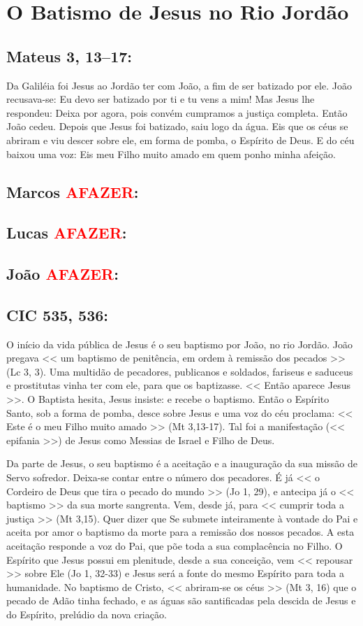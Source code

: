 \documentclass[10pt,a5paper]{book}
\newcommand{\from}[1]{\subsection*{#1}}
\newcommand{\TODO}{\textcolor{red}{\ttfamily AFAZER}}
\begin{document}

\section{O Batismo de Jesus no Rio Jordão}

\from{Mateus 3, 13--17:}

Da Galiléia foi Jesus ao Jordão ter com João, a fim de ser batizado por ele.
João recusava-se: Eu devo ser batizado por ti e tu vens a mim!
Mas Jesus lhe respondeu: Deixa por agora, pois convém cumpramos a justiça completa. Então João cedeu.
Depois que Jesus foi batizado, saiu logo da água. Eis que os céus se abriram e viu descer sobre ele, em forma de pomba, o Espírito de Deus.
E do céu baixou uma voz: Eis meu Filho muito amado em quem ponho minha afeição.

\from{Marcos \TODO:}

\from{Lucas \TODO:}

\from{João \TODO:}

\from{CIC 535, 536:}

O início da vida pública de Jesus é o seu baptismo por João, no rio Jordão. João pregava << um baptismo de penitência, em ordem à remissão dos pecados >> (Lc 3, 3). Uma multidão de pecadores, publicanos e soldados, fariseus e saduceus e prostitutas vinha ter com ele, para que os baptizasse. << Então aparece Jesus >>. O Baptista hesita, Jesus insiste: e recebe o baptismo. Então o Espírito Santo, sob a forma de pomba, desce sobre Jesus e uma voz do céu proclama: << Este é o meu Filho muito amado >> (Mt 3,13-17). Tal foi a manifestação (<< epifania >>) de Jesus como Messias de Israel e Filho de Deus.

Da parte de Jesus, o seu baptismo é a aceitação e a inauguração da sua missão de Servo sofredor. Deixa-se contar entre o número dos pecadores. É já << o Cordeiro de Deus que tira o pecado do mundo >> (Jo 1, 29), e antecipa já o << baptismo >> da sua morte sangrenta. Vem, desde já, para << cumprir toda a justiça >> (Mt 3,15). Quer dizer que Se submete inteiramente à vontade do Pai e aceita por amor o baptismo da morte para a remissão dos nossos pecados. A esta aceitação responde a voz do Pai, que põe toda a sua complacência no Filho. O Espírito que Jesus possui em plenitude, desde a sua conceição, vem << repousar >> sobre Ele (Jo 1, 32-33) e Jesus será a fonte do mesmo Espírito para toda a humanidade. No baptismo de Cristo, << abriram-se os céus >> (Mt 3, 16) que o pecado de Adão tinha fechado, e as águas são santificadas pela descida de Jesus e do Espírito, prelúdio da nova criação.
\end{document}
